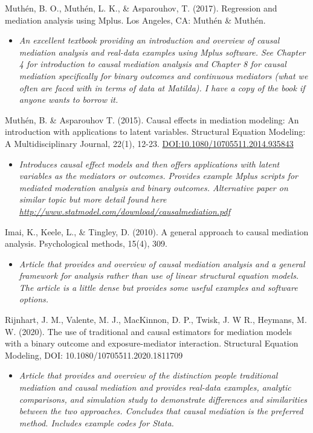 \documentclass[
]{book}
\providecommand{\tightlist}{%
  \setlength{\itemsep}{0pt}\setlength{\parskip}{0pt}}
\begin{document}
Muthén, B. O., Muthén, L. K., \& Asparouhov, T. (2017). Regression and mediation analysis using Mplus. Los Angeles, CA: Muthén \& Muthén.

\begin{itemize}
\tightlist
\item
  \emph{An excellent textbook providing an introduction and overview of causal mediation analysis and real-data examples using Mplus software. See Chapter 4 for introduction to causal mediation analysis and Chapter 8 for causal mediation specifically for binary outcomes and continuous mediators (what we often are faced with in terms of data at Matilda). I have a copy of the book if anyone wants to borrow it.}
\end{itemize}

Muthén, B. \& Asparouhov T. (2015). Causal effects in mediation modeling: An introduction with applications to latent variables. Structural Equation Modeling: A Multidisciplinary Journal, 22(1), 12-23. \url{DOI:10.1080/10705511.2014.935843}

\begin{itemize}
\tightlist
\item
  \emph{Introduces causal effect models and then offers applications with latent variables as the mediators or outcomes. Provides example Mplus scripts for mediated moderation analysis and binary outcomes. Alternative paper on similar topic but more detail found here \url{http://www.statmodel.com/download/causalmediation.pdf}}
\end{itemize}

Imai, K., Keele, L., \& Tingley, D. (2010). A general approach to causal mediation analysis. Psychological methods, 15(4), 309.

\begin{itemize}
\tightlist
\item
  \emph{Article that provides and overview of causal mediation analysis and a general framework for analysis rather than use of linear structural equation models. The article is a little dense but provides some useful examples and software options. }
\end{itemize}

Rijnhart, J. M., Valente, M. J., MacKinnon, D. P., Twisk, J. W R., Heymans, M. W. (2020). The use of traditional and causal estimators for mediation models with a binary outcome and exposure-mediator interaction. Structural Equation Modeling, DOI: 10.1080/10705511.2020.1811709

\begin{itemize}
\tightlist
\item
  \emph{Article that provides and overview of the distinction people traditional mediation and causal mediation and provides real-data examples, analytic comparisons, and simulation study to demonstrate differences and similarities between the two approaches. Concludes that causal mediation is the preferred method. Includes example codes for Stata. }
\end{itemize}
\end{document}
